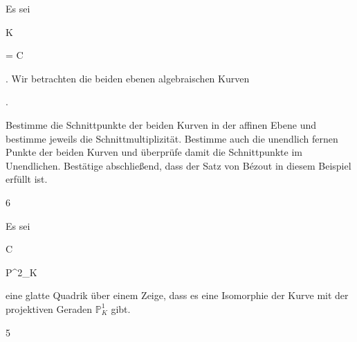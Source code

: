 {


Es sei


\mavergleichskette

{\vergleichskette

{ K
}

{ = }{ {\mathbb C}
}

{  }{
}

{    }{
}

{   }{
}

}
{}{}{.}
Wir betrachten die beiden ebenen algebraischen Kurven


 { . }


Bestimme die Schnittpunkte der beiden Kurven in der affinen Ebene und bestimme jeweils die Schnittmultiplizität. Bestimme auch die unendlich fernen Punkte der beiden Kurven
 {} {} und überprüfe damit die Schnittpunkte im Unendlichen. Bestätige abschließend, dass der Satz von Bézout in diesem Beispiel erfüllt ist.


}

{} {}





{6}

{


Es sei


\mavergleichskette

{\vergleichskette

{ C
}

{ \subseteq }{ {\mathbb P}^{2}_{K}
}

{  }{
}

{    }{
}

{   }{
}

}
{}{}{}
eine glatte Quadrik
 {} {}
über einem
Zeige, dass es eine Isomorphie der Kurve mit der projektiven Geraden ${\mathbb P}^{1}_{K}$ gibt.


}

{} {}



{5}

